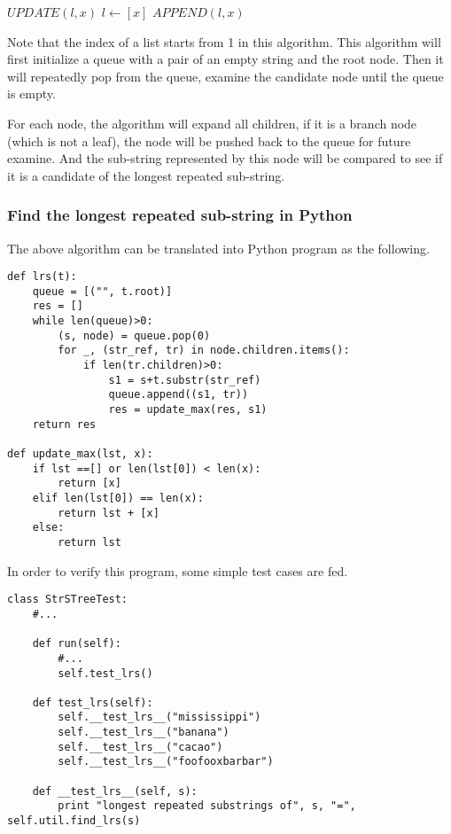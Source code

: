 \documentclass{article}
\begin{document}
\begin{algorithmic}
\STATE $UPDATE(l, x)$
    \RETURN $l \leftarrow [x]$
    \RETURN $APPEND(l, x)$
  \ENDIF
\end{algorithmic}

Note that the index of a list starts from 1 in this algorithm.
This algorithm will first initialize a queue with a pair of an
empty string and the root node. Then it will repeatedly pop from
the queue, examine the candidate node until the queue is empty.

For each node, the algorithm will expand all children, if it is 
a branch node (which is not a leaf), the node will be pushed back
to the queue for future examine. And the sub-string represented
by this node will be compared to see if it is a candidate of the
longest repeated sub-string.

\subsubsection*{Find the longest repeated sub-string in Python}
The above algorithm can be translated into Python program as the following.

\lstset{language=Python}
\begin{lstlisting}
def lrs(t):
    queue = [("", t.root)]
    res = []
    while len(queue)>0:
        (s, node) = queue.pop(0)
        for _, (str_ref, tr) in node.children.items():
            if len(tr.children)>0:
                s1 = s+t.substr(str_ref)
                queue.append((s1, tr))
                res = update_max(res, s1)
    return res

def update_max(lst, x):
    if lst ==[] or len(lst[0]) < len(x):
        return [x]
    elif len(lst[0]) == len(x):
        return lst + [x]
    else:
        return lst
\end{lstlisting}

In order to verify this program, some simple test cases are fed.

\begin{lstlisting}
class StrSTreeTest:
    #...

    def run(self):
        #...
        self.test_lrs()

    def test_lrs(self):
        self.__test_lrs__("mississippi")
        self.__test_lrs__("banana")
        self.__test_lrs__("cacao")
        self.__test_lrs__("foofooxbarbar")

    def __test_lrs__(self, s):
        print "longest repeated substrings of", s, "=", self.util.find_lrs(s)
\end{lstlisting}
\end{document}

